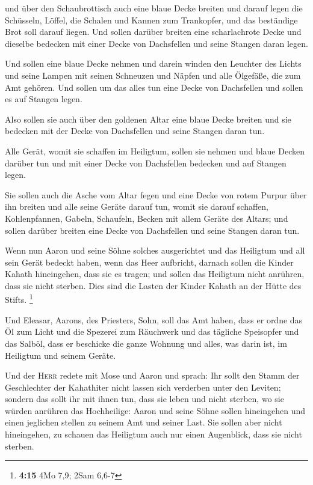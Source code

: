  und über den Schaubrottisch auch eine blaue Decke breiten
und darauf legen die Schüsseln, Löffel, die Schalen und Kannen zum
Trankopfer, und das beständige Brot soll darauf liegen. 
Und sollen darüber breiten eine scharlachrote Decke und dieselbe
bedecken mit einer Decke von Dachsfellen und seine Stangen daran legen.

 Und sollen eine blaue Decke nehmen und darein winden den
Leuchter des Lichts und seine Lampen mit seinen Schneuzen und Näpfen und
alle Ölgefäße, die zum Amt gehören.  Und sollen um das
alles tun eine Decke von Dachsfellen und sollen es auf Stangen legen.

 Also sollen sie auch über den goldenen Altar eine blaue
Decke breiten und sie bedecken mit der Decke von Dachsfellen und seine
Stangen daran tun.

 Alle Gerät, womit sie schaffen im Heiligtum, sollen sie
nehmen und blaue Decken darüber tun und mit einer Decke von Dachsfellen
bedecken und auf Stangen legen.

 Sie sollen auch die Asche vom Altar fegen und eine Decke
von rotem Purpur über ihn breiten  und alle seine Geräte
darauf tun, womit sie darauf schaffen, Kohlenpfannen, Gabeln, Schaufeln,
Becken mit allem Geräte des Altars; und sollen darüber breiten eine
Decke von Dachsfellen und seine Stangen daran tun.

 Wenn nun Aaron und seine Söhne solches ausgerichtet und
das Heiligtum und all sein Gerät bedeckt haben, wenn das Heer aufbricht,
darnach sollen die Kinder Kahath hineingehen, dass sie es tragen; und
sollen das Heiligtum nicht anrühren, dass sie nicht sterben. Dies sind
die Lasten der Kinder Kahath an der Hütte des Stifts. \footnote{\textbf{4:15}
  4Mo 7,9; 2Sam 6,6-7}

 Und Eleasar, Aarons, des Priesters, Sohn, soll das Amt
haben, dass er ordne das Öl zum Licht und die Spezerei zum Räuchwerk und
das tägliche Speisopfer und das Salböl, dass er beschicke die ganze
Wohnung und alles, was darin ist, im Heiligtum und seinem Geräte.

 Und der \textsc{Herr} redete mit Mose und Aaron und
sprach:  Ihr sollt den Stamm der Geschlechter der
Kahathiter nicht lassen sich verderben unter den Leviten;
 sondern das sollt ihr mit ihnen tun, dass sie leben und
nicht sterben, wo sie würden anrühren das Hochheilige: Aaron und seine
Söhne sollen hineingehen und einen jeglichen stellen zu seinem Amt und
seiner Last.  Sie sollen aber nicht hineingehen, zu
schauen das Heiligtum auch nur einen Augenblick, dass sie nicht sterben.

